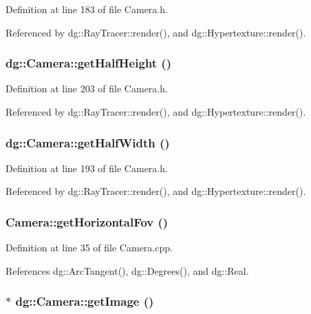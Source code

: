 Definition at line 183 of file Camera.h.

Referenced by dg::Ray\-Tracer::render(), and dg::Hypertexture::render().
\subsubsection{ dg::Camera::get\-Half\-Height ()\hspace{0.3cm}{\tt  [inline]}}\label{classdg_1_1Camera_a20}




Definition at line 203 of file Camera.h.

Referenced by dg::Ray\-Tracer::render(), and dg::Hypertexture::render().
\subsubsection{ dg::Camera::get\-Half\-Width ()\hspace{0.3cm}{\tt  [inline]}}\label{classdg_1_1Camera_a16}




Definition at line 193 of file Camera.h.

Referenced by dg::Ray\-Tracer::render(), and dg::Hypertexture::render().
\subsubsection{ Camera::get\-Horizontal\-Fov ()\hspace{0.3cm}{\tt  [inline]}}\label{classdg_1_1Camera_a18}




Definition at line 35 of file Camera.cpp.

References dg::Arc\-Tangent(), dg::Degrees(), and dg::Real.
\subsubsection{ $\ast$ dg::Camera::get\-Image ()\hspace{0.3cm}{\tt  [inline]}}\label{classdg_1_1Camera_a29}




